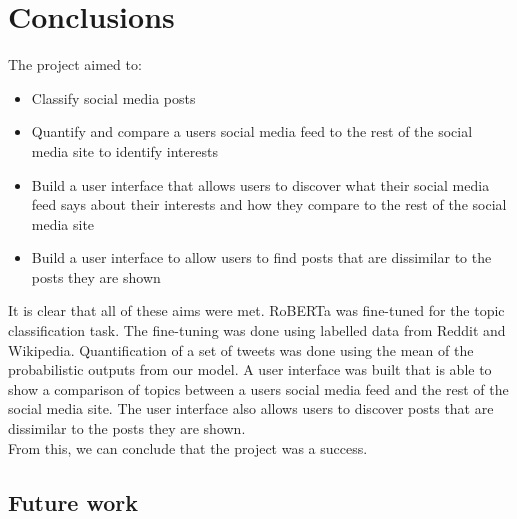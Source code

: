 \chapter{Conclusions}
\label{ch:conclusions}

The project aimed to:
\begin{itemize}
    \item Classify social media posts
    \item Quantify and compare a users social media feed to the rest of the social media site to identify interests
    \item Build a user interface that allows users to discover what their social media feed says about their interests and how they compare to the rest of the social media site
    \item Build a user interface to allow users to find posts that are dissimilar to the posts they are shown
\end{itemize}

It is clear that all of these aims were met. RoBERTa was fine-tuned for the topic classification task. The fine-tuning was done
using labelled data from Reddit and Wikipedia. Quantification of a set of tweets was done using the mean of the probabilistic outputs
from our model. A user interface was built that is able to show a comparison of topics between a users social media feed and the rest
of the social media site. The user interface also allows users to discover posts that are dissimilar to the posts they are shown.\\
From this, we can conclude that the project was a success.
\section{Future work}
